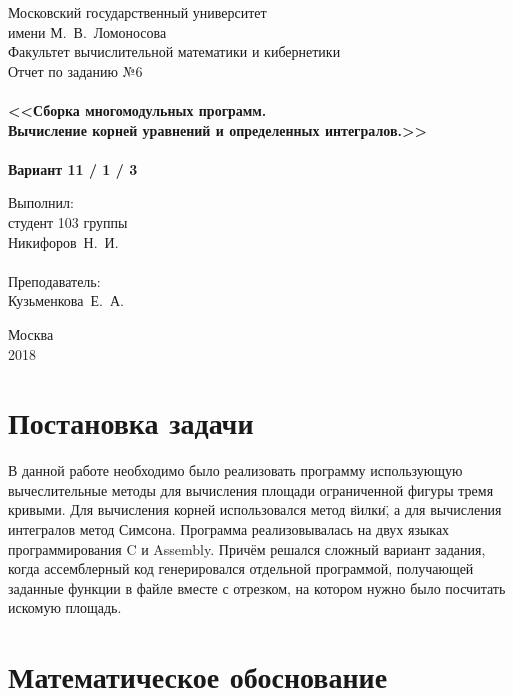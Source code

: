 \documentclass[a4paper,12pt,titlepage,finall]{article}
\begin{document}
\begin{titlepage}
    \begin{center}
	{\small \sc Московский государственный университет \\имени М.~В.~Ломоносова\\
	Факультет вычислительной математики и кибернетики\\}
	\vfill
	{\Large \sc Отчет по заданию №6}\\
  ~\\
	{\large \bf <<Сборка многомодульных программ. \\
	Вычисление корней уравнений и определенных интегралов.>>}\\ 
	~\\
	{\large \bf Вариант 11 / 1 / 3}
    \end{center}
    \begin{flushright}
	\vfill {Выполнил:\\
	студент 103 группы\\
	Никифоров~Н.~И.\\
	~\\
	Преподаватель:\\
	Кузьменкова~Е.~А.}
    \end{flushright}
    \begin{center}
	\vfill
	{\small Москва\\2018}
    \end{center}
\end{titlepage}

\tableofcontents
\newpage

\section{Постановка задачи}

В данной работе необходимо было реализовать программу использующую вычеслительные методы для вычисления площади ограниченной фигуры тремя кривыми. Для вычисления корней использовался метод \"вилки\", а для вычисления интегралов метод Симсона. Программа реализовывалась на двух языках программирования C и Assembly. Причём решался сложный вариант задания, когда ассемблерный код генерировался отдельной программой, получающей заданные функции в файле вместе с отрезком, на котором нужно было посчитать искомую площадь.

\newpage

\section{Математическое обоснование}
\end{document}
